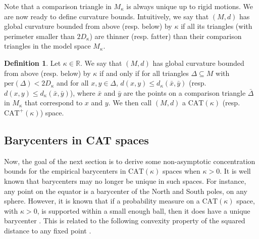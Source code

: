 \documentclass[10pt,a4paper]{article}
\theoremstyle{plain}
\theoremstyle{definition}
\newtheorem{definition}[theorem]{Definition}
\theoremstyle{remark}
\newcommand{\R}{\mathbb{R}}
\newcommand{\per}{\mathrm{per}}
\newcommand{\CAT}{\textrm{CAT}}
\begin{document}
Note that a comparison triangle in $M_\kappa$ is always unique up to rigid motions. We are now ready to define curvature bounds. Intuitively, we say that $(M,d)$ has global curvature bounded from above (resp. below) by $\kappa$ if all its triangles (with perimeter smaller than $2D_\kappa$) are thinner (resp. fatter) than their comparison triangles in the model space $M_\kappa$. 

\begin{definition}
	Let $\kappa\in\R$. We say that $(M,d)$ has global curvature bounded from above (resp. below) by $\kappa$ if and only if for all triangles $\Delta\subseteq M$ with $\per(\Delta)<2D_\kappa$ and for all $x,y\in \Delta$, $d(x,y)\leq d_\kappa(\bar x,\bar y)$ (resp. $d(x,y)\leq d_\kappa(\bar x,\bar y)$), where $\bar x$ and $\bar y$ are the points on a comparison triangle $\bar\Delta$ in $M_\kappa$ that correspond to $x$ and $y$. We then call $(M,d)$ a $\CAT(\kappa)$ (resp. $\CAT^+(\kappa)$) space. 
\end{definition}
































\subsection{Barycenters in CAT spaces}


Now, the goal of the next section is to derive some non-asymptotic concentration bounds for the empirical barycenters in $\CAT(\kappa)$ spaces when $\kappa>0$. It is well known that barycenters may no longer be unique in such spaces. For instance, any point on the equator is a barycenter of the North and South poles, on any sphere. However, it is known that if a probability measure on a $\CAT(\kappa)$ space, with $\kappa>0$, is supported within a small enough ball, then it does have a unique barycenter \cite[Theorem B]{Yokota16}. This is related to the following convexity property of the squared distance to any fixed point \cite[Proposition 3.1]{Ohtaconvexity}.
\end{document}
